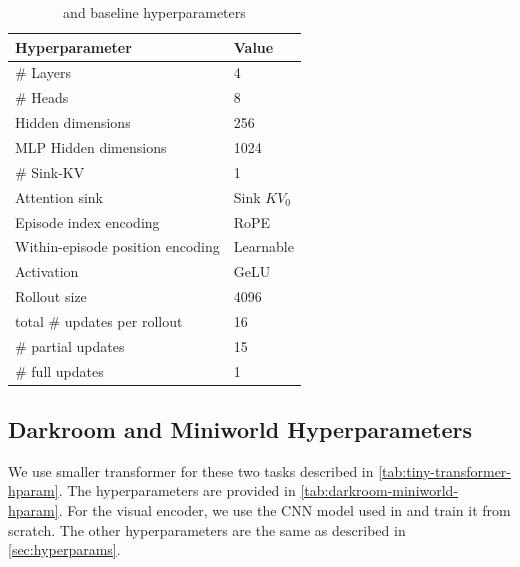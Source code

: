 \begin{table}[!h]
    \centering
    \medskip
  \begin{tabular}{ll}
    \toprule
    Hyperparameter     & Value \\
    \midrule
    \# Layers & 4 \\
    \# Heads & 8 \\
    Hidden dimensions & 256 \\
    MLP Hidden dimensions & 1024 \\
    \# Sink-KV & 1 \\
    Attention sink & Sink $KV_0$ \\
    Episode index encoding & RoPE \cite{su2023roformer} \\
    Within-episode position encoding & Learnable \\
    Activation & GeLU \cite{shazeer2020glu} \\
    Rollout size & 4096 \\
    total \# updates per rollout & 16 \\
    \# partial updates & 15 \\
    \# full updates & 1 \\
    \bottomrule
  \end{tabular}
  \centering
  \caption{\method and baseline hyperparameters}
  \label{tab:method-hparam}
  \label{tab:transformer-hparam}
\end{table}

\subsection{Darkroom and Miniworld Hyperparameters}
\label{sec:dark_n_min_hyperparams}

We use smaller transformer for these two tasks described in \cref{tab:tiny-transformer-hparam}. The \method hyperparameters are provided in \cref{tab:darkroom-miniworld-hparam}. For the visual encoder, we use the CNN model used in \cite{lee2023supervisedpretraininglearnincontext} and train it from scratch. The other hyperparameters are the same as described in \cref{sec:hyperparams}.


